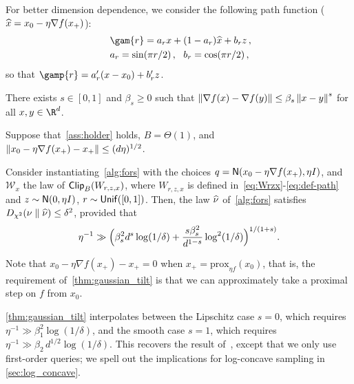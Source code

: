 For better dimension dependence, we consider the following path function ($\xhat=\xz-\eta\nabla f(x_+)$): 
\begin{align}\label{eq:def-path}
\begin{aligned}
    &~\gam{\lr}=\alr x + (1-\alr) \xhat + \blr z\,, \\
    &~\alr=\sin(\pi\lr/2)\,, ~~\blr=\cos(\pi\lr/2)\,,
\end{aligned}
\end{align}
so that $\gamp{\lr}=\alrp (x -\xz) + \blrp z$.

\begin{assumption}\label{ass:holder}
    There exists $s \in [0,1]$ and $\beta_s \ge 0$ such that $\norm{\nabla f(x) -\nabla f(y)} \le \beta_s\norm{x-y}^s$ for all $x,y\in\R^d$.
\end{assumption}

\begin{theorem}\label{thm:gaussian_tilt}
    Suppose that~\cref{ass:holder} holds, $B=\Theta(1)$, and $\nrm{\xz-\eta\nabla f(x_+) - x_+} \leq (d\eta)^{1/2}$.
    
    Consider instantiating~\cref{alg:fors} with the choices $q = \normal{\xz-\eta \nabla f(\xp),\eta\Id}$, and $\mathcal W_x$ the law of $\pclip{W_{r,z,x}}$, where $W_{r,z,x}$ is defined in~\eqref{eq:Wrzx}-\eqref{eq:def-path} and $z\sim \normal{0,\eta\Id}$, $r\sim \unif([0,1])$. 
    Then, the law $\wh\nu$ of~\cref{alg:fors} satisfies $\Dchis{\nu}{\wh\nu} \le \delta^2$, provided that
    \begin{align*}
        \eta^{-1} \gg \prn[\Big]{ \beta_s^2d^s\log(1/\delta)+\frac{s\beta_s^2}{d^{1-s}}\log^2(1/\delta) }^{1/(1+s)}.
    \end{align*}
\end{theorem}

Note that $x_0 - \eta\nabla f(x_+) - x_+ = 0$ when $x_+ = \text{prox}_{\eta f}(x_0)$, that is, the requirement of~\cref{thm:gaussian_tilt} is that we can approximately take a proximal step on $f$ from $x_0$.

\cref{thm:gaussian_tilt} interpolates between the Lipschitz case $s=0$, which requires $\eta^{-1} \gg \beta_1^2 \log(1/\delta)$, and the smooth case $s=1$, which requires $\eta^{-1} \gg \beta_2\, d^{1/2} \log(1/\delta)$.
This recovers the result of~\citet{FanYuaChe23ImprovedProx}, except that we only use first-order queries; we spell out the implications for log-concave sampling in \cref{sec:log_concave}.
